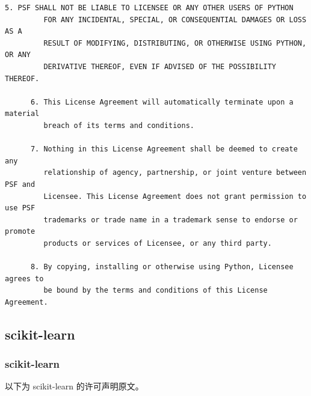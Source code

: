 \begin{lstlisting}[basicstyle=\ttfamily\footnotesize,breaklines=true]
      5. PSF SHALL NOT BE LIABLE TO LICENSEE OR ANY OTHER USERS OF PYTHON
         FOR ANY INCIDENTAL, SPECIAL, OR CONSEQUENTIAL DAMAGES OR LOSS AS A
         RESULT OF MODIFYING, DISTRIBUTING, OR OTHERWISE USING PYTHON, OR ANY
         DERIVATIVE THEREOF, EVEN IF ADVISED OF THE POSSIBILITY THEREOF.

      6. This License Agreement will automatically terminate upon a material
         breach of its terms and conditions.

      7. Nothing in this License Agreement shall be deemed to create any
         relationship of agency, partnership, or joint venture between PSF and
         Licensee. This License Agreement does not grant permission to use PSF
         trademarks or trade name in a trademark sense to endorse or promote
         products or services of Licensee, or any third party.

      8. By copying, installing or otherwise using Python, Licensee agrees to
         be bound by the terms and conditions of this License Agreement.
\end{lstlisting}

\subsection{scikit-learn}
\subsubsection*{scikit-learn}

以下为 scikit-learn 的许可声明原文。

